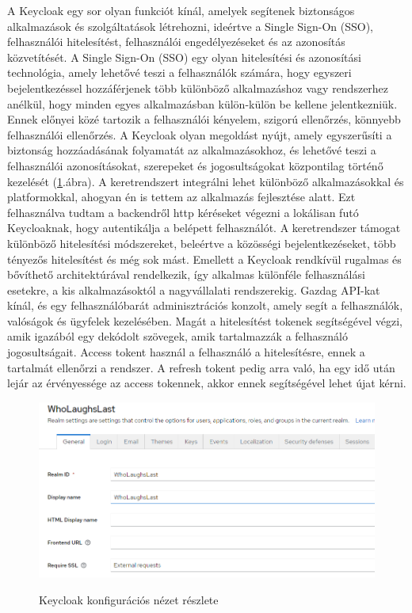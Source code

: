 \documentclass[a4paper,twoside]{article}
\begin{document}
A Keycloak egy sor olyan funkciót kínál, amelyek segítenek biztonságos alkalmazások és szolgáltatások létrehozni, ideértve a Single Sign-On (SSO), felhasználói hitelesítést, felhasználói engedélyezéseket és az azonosítás közvetítését. A Single Sign-On (SSO) egy olyan hitelesítési és azonosítási technológia, amely lehetővé teszi a felhasználók számára, hogy egyszeri bejelentkezéssel hozzáférjenek több különböző alkalmazáshoz vagy rendszerhez anélkül, hogy minden egyes alkalmazásban külön-külön be kellene jelentkezniük. Ennek előnyei közé tartozik a felhasználói kényelem, szigorú ellenőrzés, könnyebb felhasználói ellenőrzés. A Keycloak olyan megoldást nyújt, amely egyszerűsíti a biztonság hozzáadásának folyamatát az alkalmazásokhoz, és lehetővé teszi a felhasználói azonosításokat, szerepeket és jogosultságokat központilag történő kezelését (\ref{keycloak-login}.ábra). A keretrendszert integrálni lehet különböző alkalmazásokkal és platformokkal, ahogyan én is tettem az alkalmazás fejlesztése alatt. Ezt felhasználva tudtam a backendről http kéréseket végezni a lokálisan futó Keycloaknak, hogy autentikálja a belépett felhasználót. A keretrendszer támogat különböző hitelesítési módszereket, beleértve a közösségi bejelentkezéseket, több tényezős hitelesítést és még sok mást. Emellett a Keycloak rendkívül rugalmas és bővíthető architektúrával rendelkezik, így alkalmas különféle felhasználási esetekre, a kis alkalmazásoktól a nagyvállalati rendszerekig. Gazdag API-kat kínál, és egy felhasználóbarát adminisztrációs konzolt, amely segít a felhasználók, valóságok és ügyfelek kezelésében. Magát a hitelesítést tokenek segítségével végzi, amik igazából egy dekódolt szövegek, amik tartalmazzák a felhasználó jogosultságait. Access tokent használ a felhasználó a hitelesítésre, ennek a tartalmát ellenőrzi a rendszer. A refresh tokent pedig arra való, ha egy idő után lejár az érvényessége az access tokennek, akkor ennek segítségével lehet újat kérni.

\begin{figure}
	\caption{Keycloak konfigurációs nézet részlete}
	\includegraphics[scale=0.5]{keycloak-login}
	\label{keycloak-login}
\end{figure}
\end{document}
